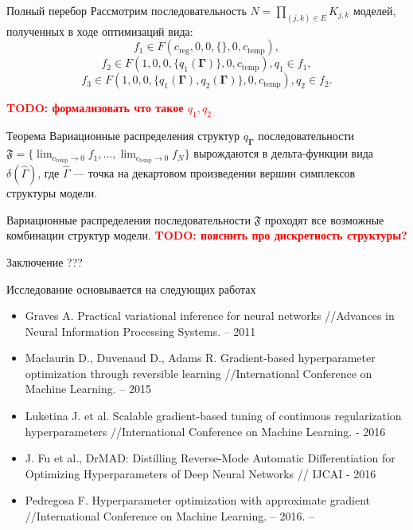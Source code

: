 \documentclass[usenames,dvipsnames,11pt,pdf,utf8,russian,aspectratio=169]{beamer}
\begin{document}
\begin{frame}{Полный перебор}
Рассмотрим последовательность $N = \prod_{(j,k) \in E} K_{j,k}$ моделей, полученных в ходе оптимизаций вида:
$$f_1 \in F(c_{\text{reg}}, 0, 0, \{\}, 0,  c_{\text{temp}}),$$
$$f_2 \in F(1, 0, 0, \{q_1(\boldsymbol{\Gamma})\}, 0,  c_{\text{temp}}), q_1 \in f_1,$$
$$f_3 \in F(1, 0, 0, \{q_1(\boldsymbol{\Gamma}), q_2(\boldsymbol{\Gamma})\}, 0,  c_{\text{temp}}), q_2 \in f_2.$$

\textcolor{red}{\textbf{TODO: формализовать что такое $q_1, q_2$\\}}

\begin{block}{Теорема}
Вариационные распределения структур $q_{\boldsymbol{\Gamma}}$ последовательности $\mathfrak{F} = \{\lim_{c_{\text{temp}} \to 0} f_1, \dots, \lim_{c_{\text{temp}} \to 0} f_N\}$ вырождаются в дельта-функции вида $\delta(\hat{\Gamma})$, где $\hat{\Gamma}$ --- точка на декартовом произведении вершин симплексов структуры модели.

Вариационные распределения последовательности $\mathfrak{F}$ проходят все возможные комбинации структур модели.
\textcolor{red}{\textbf{TODO: пояснить про дискретность структуры?\\}}
\end{block}
\end{frame}


\begin{frame}{Заключение}
???

\end{frame}

\appendix
\bgroup
{}
\begin{frame}
\end{frame}
\egroup



\begin{frame}{Исследование основывается на следующих работах}
\begin{itemize}
\item Graves A. Practical variational inference for neural networks //Advances in Neural Information Processing Systems. – 2011
\item  Maclaurin D., Duvenaud D., Adams R. Gradient-based hyperparameter optimization through reversible learning //International Conference on Machine Learning. – 2015
\item  Luketina J. et al. Scalable gradient-based tuning of continuous regularization hyperparameters //International Conference on Machine Learning. - 2016
\item J. Fu et al., DrMAD: Distilling Reverse-Mode Automatic Differentiation for Optimizing
Hyperparameters of Deep Neural Networks // IJCAI - 2016
\item Pedregosa F. Hyperparameter optimization with approximate gradient //International Conference on Machine Learning. – 2016. –
\end{itemize}
\end{frame}
\end{document}
